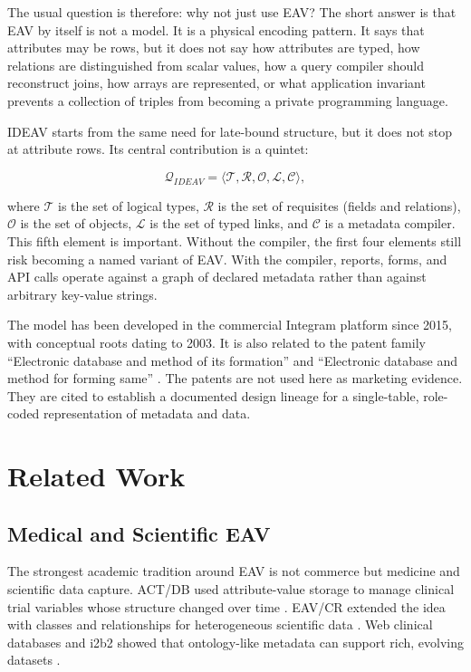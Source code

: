 \documentclass[11pt]{article}
\begin{document}
The usual question is therefore: why not just use EAV? The short answer is that
EAV by itself is not a model. It is a physical encoding pattern. It says that
attributes may be rows, but it does not say how attributes are typed, how
relations are distinguished from scalar values, how a query compiler should
reconstruct joins, how arrays are represented, or what application invariant
prevents a collection of triples from becoming a private programming language.

IDEAV starts from the same need for late-bound structure, but it does not stop at
attribute rows. Its central contribution is a quintet:

\[
  \mathcal{Q}_{IDEAV} =
  \langle \mathcal{T}, \mathcal{R}, \mathcal{O}, \mathcal{L}, \mathcal{C} \rangle ,
\]

where \(\mathcal{T}\) is the set of logical types, \(\mathcal{R}\) is the set of
requisites (fields and relations), \(\mathcal{O}\) is the set of objects,
\(\mathcal{L}\) is the set of typed links, and \(\mathcal{C}\) is a metadata
compiler. This fifth element is important. Without the compiler, the first four
elements still risk becoming a named variant of EAV. With the compiler, reports,
forms, and API calls operate against a graph of declared metadata rather than
against arbitrary key-value strings.

The model has been developed in the commercial Integram platform since 2015,
with conceptual roots dating to 2003. It is also related to the patent family
``Electronic database and method of its formation'' \citep{semenov2018ru} and
``Electronic database and method for forming same'' \citep{semenov2021us}. The
patents are not used here as marketing evidence. They are cited to establish a
documented design lineage for a single-table, role-coded representation of
metadata and data.

\section{Related Work}

\subsection{Medical and Scientific EAV}

The strongest academic tradition around EAV is not commerce but medicine and
scientific data capture. ACT/DB used attribute-value storage to manage clinical
trial variables whose structure changed over time \citep{nadkarni1998actdb}.
EAV/CR extended the idea with classes and relationships for heterogeneous
scientific data \citep{nadkarni1999eavcr,marenco2003eavcr}. Web clinical
databases and i2b2 showed that ontology-like metadata can support rich,
evolving datasets \citep{anhoj2003generic,murphy2010i2b2}.
\end{document}
